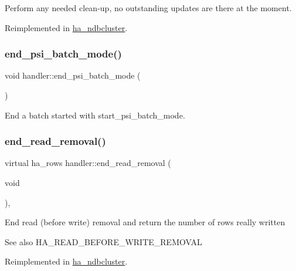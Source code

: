 Perform any needed clean-\/up, no outstanding updates are there at the moment. 

Reimplemented in \mbox{\hyperlink{classha__ndbcluster_a3c3b80b72e921059f62aed3eda1db911}{ha\+\_\+ndbcluster}}.

\mbox{\label{classhandler_ab6a860cb6d6cb731416080acc8f179e0}} 
\subsubsection{\texorpdfstring{end\+\_\+psi\+\_\+batch\+\_\+mode()}{end\_psi\_batch\_mode()}}
{\footnotesize\ttfamily void handler\+::end\+\_\+psi\+\_\+batch\+\_\+mode (\begin{DoxyParamCaption}{ }\end{DoxyParamCaption})}

End a batch started with {\ttfamily start\+\_\+psi\+\_\+batch\+\_\+mode}. \mbox{\label{classhandler_a517d99c283e85e8d97460f07a781dabf}} 
\subsubsection{\texorpdfstring{end\+\_\+read\+\_\+removal()}{end\_read\_removal()}}
{\footnotesize\ttfamily virtual ha\+\_\+rows handler\+::end\+\_\+read\+\_\+removal (\begin{DoxyParamCaption}\item[{void}]{ }\end{DoxyParamCaption})\hspace{0.3cm}{\ttfamily [inline]}, {\ttfamily [virtual]}}

End read (before write) removal and return the number of rows really written \begin{DoxySeeAlso}{See also}
H\+A\+\_\+\+R\+E\+A\+D\+\_\+\+B\+E\+F\+O\+R\+E\+\_\+\+W\+R\+I\+T\+E\+\_\+\+R\+E\+M\+O\+V\+AL 
\end{DoxySeeAlso}


Reimplemented in \mbox{\hyperlink{classha__ndbcluster_a81e58b0a19c7cc7d857a3f00e039ae37}{ha\+\_\+ndbcluster}}.

\mbox{\label{classhandler_ae59e9a1d36d852f4dd5dd00bff5f1ae4}} 
